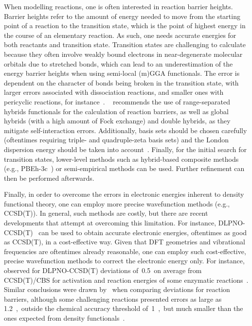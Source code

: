 When modelling reactions,
one is often interested in reaction barrier heights.
Barrier heights refer to the amount of energy needed to move from the starting point of a reaction to the transition state,
which is the point of highest energy in the course of an elementary reaction.
As such,
one needs accurate energies for both reactants and transition state.
Transition states are challenging to calculate because they often involve weakly bound electrons
in near-degenerate molecular orbitals
due to stretched bonds,
which can lead to an underestimation of the energy barrier heights when using semi-local (m)GGA functionals.
The error is dependent on the character of bonds being broken in the transition state,
with larger errors associated with dissociation reactions,
and smaller ones with pericyclic reactions,
for instance~\cite{Bursch_2022}.
\citeauthor{Bursch_2022}~\cite{Bursch_2022} recommends the use of range-separated hybrids functionals for the calculation of reaction barriers,
as well as global hybrids (with a high amount of Fock exchange) and double hybrids,
as they mitigate self-interaction errors.
Additionally,
basis sets should be chosen carefully (oftentimes requiring triple-
and quadruple-zeta basis sets) and the London dispersion energy should be taken into account~\cite{Bursch_2022}.
Finally,
for the initial search for transition states,
lower-level methods such as hybrid-based composite methods (e.g.,
PBEh-3c~\cite{Grimme_2015}) or semi-empirical methods can be used.
Further refinement can then be performed afterwards.

Finally,
in order to overcome the errors in electronic energies inherent to density functional theory,
one can employ more precise wavefunction methods (e.g.,
CCSD(T)).
In general,
such methods are costly,
but there are recent developments that attempt at overcoming this limitation.
For instance,
DLPNO-CCSD(T)~\cite{Riplinger_2013,Riplinger_2016}
can be used to obtain accurate electronic energies,
oftentimes
as good as CCSD(T),
in a cost-effective way.
Given that DFT geometries and vibrational frequencies are oftentimes already reasonable,
one can employ such cost-effective,
precise wavefunction methods to correct the electronic energy only.
For instance,~\cite{Paiva_2020} observed for DLPNO-CCSD(T)
deviations of~0.5~\kcalmol on average from CCSD(T)/CBS for
activation and reaction energies of some enzymatic reactions~\cite{Paiva_2020}.
Similar conclusions were drawn by~\cite{Sandler_2021}
when comparing deviations for reaction barriers,
although
some challenging reactions presented errors as large as 1.2~\kcalmol,~outside the chemical accuracy threshold of~1~\kcalmol,~but
much smaller than the ones expected from density functionals~\cite{Sandler_2021}.

